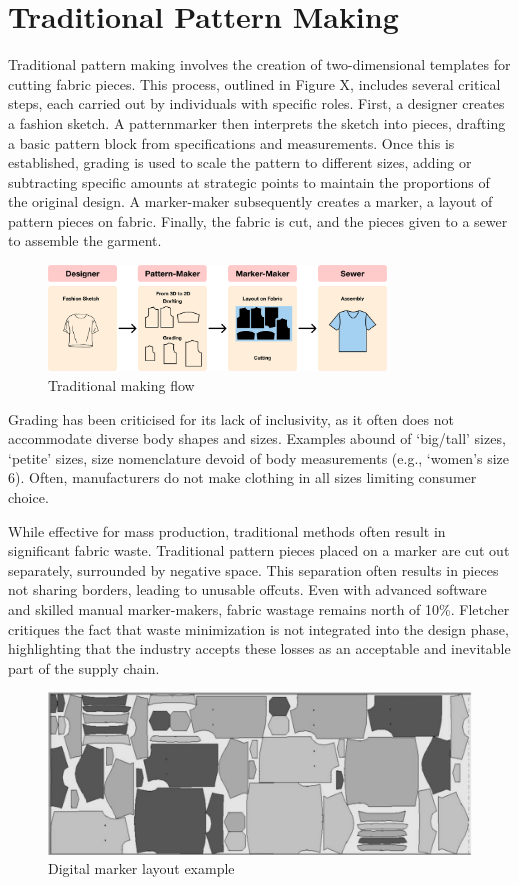 \section{Traditional Pattern Making}
Traditional pattern making involves the creation of two-dimensional templates for cutting fabric pieces. This process, outlined in Figure X, includes several critical steps, each carried out by individuals with specific roles. First, a designer creates a fashion sketch. A patternmarker then interprets the sketch into pieces, drafting a basic pattern block from specifications and measurements. Once this is established, grading is used to scale the pattern to different sizes, adding or subtracting specific amounts at strategic points to maintain the proportions of the original design. A marker-maker subsequently creates a marker, a layout of pattern pieces on fabric. Finally, the fabric is cut, and the pieces given to a sewer to assemble the garment.
\begin{figure} [H]
    \centering
    \includegraphics[width=0.8\textwidth]{Images/traditional process diagram.png}
    \caption{Traditional making flow}
\end{figure}
Grading has been criticised for its lack of inclusivity, as it often does not accommodate diverse body shapes and sizes. Examples abound of ‘big/tall’ sizes, ‘petite’ sizes, size nomenclature devoid of body measurements (e.g., ‘women’s size 6). Often, manufacturers do not make clothing in all sizes limiting consumer choice.

While effective for mass production, traditional methods often result in significant fabric waste. Traditional pattern pieces placed on a marker are cut out separately, surrounded by negative space. This separation often results in pieces not sharing borders, leading to unusable offcuts.  Even with advanced software and skilled manual marker-makers, fabric wastage remains north of 10\%. Fletcher critiques the fact that waste minimization is not integrated into the design phase, highlighting that the industry accepts these losses as an acceptable and inevitable part of the supply chain.
\begin{figure} [H]
    \centering
    \includegraphics[width=\textwidth]{Images/digital marker layout.png}
    \caption{Digital marker layout example}
\end{figure}

